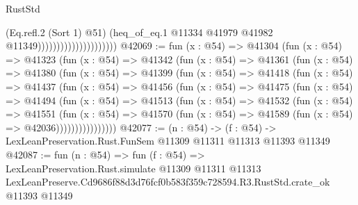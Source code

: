 \begin{lexlean}{RustStd}
\begin{coremodule}
                                            (Eq.refl.{2} (Sort 1) @51)
                                            (heq_of_eq.{1}
                                              @11334
                                              @41979
                                              @41982
                                              @11349)))))))))))))))))))))
@42069 := fun (x : @54) =>
  @41304
    (fun (x : @54) =>
    @41323
      (fun (x : @54) =>
      @41342
        (fun (x : @54) =>
        @41361
          (fun (x : @54) =>
          @41380
            (fun (x : @54) =>
            @41399
              (fun (x : @54) =>
              @41418
                (fun (x : @54) =>
                @41437
                  (fun (x : @54) =>
                  @41456
                    (fun (x : @54) =>
                    @41475
                      (fun (x : @54) =>
                      @41494
                        (fun (x : @54) =>
                        @41513
                          (fun (x : @54) =>
                          @41532
                            (fun (x : @54) =>
                            @41551
                              (fun (x : @54) =>
                              @41570
                                (fun (x : @54) => @41589 (fun (x : @54) => @42036))))))))))))))))
@42077 := (n : @54) ->
  (f : @54) -> LexLeanPreservation.Rust.FunSem @11309 @11311 @11313 @11393 @11349
@42087 := fun (n : @54) =>
  fun (f : @54) =>
  LexLeanPreservation.Rust.simulate
    @11309
    @11311
    @11313
    LexLeanPreserve.Cd9686f88d3d76fcf0b583f359c728594.R3.RustStd.crate_ok
    @11393
    @11349
\end{coremodule}
\end{lexlean}
